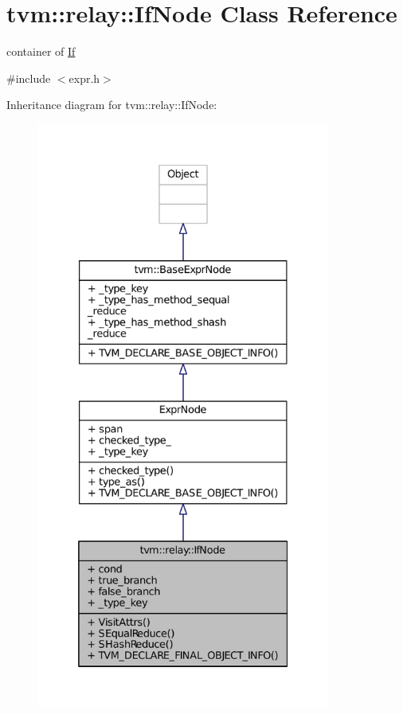 \hypertarget{classtvm_1_1relay_1_1IfNode}{}\section{tvm\+:\+:relay\+:\+:If\+Node Class Reference}
\label{classtvm_1_1relay_1_1IfNode}


container of \hyperlink{classtvm_1_1relay_1_1If}{If}  




{\ttfamily \#include $<$expr.\+h$>$}



Inheritance diagram for tvm\+:\+:relay\+:\+:If\+Node\+:
\nopagebreak
\begin{figure}[H]
\begin{center}
\leavevmode
\includegraphics[height=550pt]{classtvm_1_1relay_1_1IfNode__inherit__graph}
\end{center}
\end{figure}


